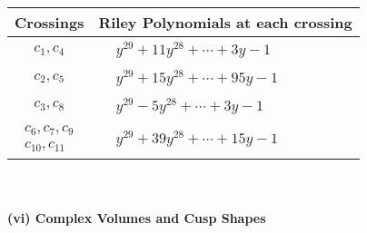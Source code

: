 \documentclass[1p]{elsarticle_modified}
\theoremstyle{definition}
\begin{document}
\begin{tabular}{m{50pt}|m{274pt}}
Crossings & \hspace{64pt}Riley Polynomials at each crossing \\
\hline $$\begin{aligned}c_{1},c_{4}\end{aligned}$$&$\begin{aligned}
&y^{29}+11 y^{28}+\cdots+3 y-1
\end{aligned}$\\
\hline $$\begin{aligned}c_{2},c_{5}\end{aligned}$$&$\begin{aligned}
&y^{29}+15 y^{28}+\cdots+95 y-1
\end{aligned}$\\
\hline $$\begin{aligned}c_{3},c_{8}\end{aligned}$$&$\begin{aligned}
&y^{29}-5 y^{28}+\cdots+3 y-1
\end{aligned}$\\
\hline $$\begin{aligned}c_{6},c_{7},c_{9}\\c_{10},c_{11}\end{aligned}$$&$\begin{aligned}
&y^{29}+39 y^{28}+\cdots+15 y-1
\end{aligned}$\\
\hline
\end{tabular}\\~\\
\newpage\flushleft \textbf{(vi) Complex Volumes and Cusp Shapes}
\end{document}
